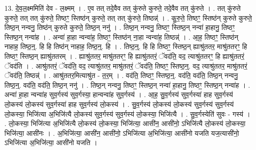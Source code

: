 \documentclass[17pt]{extarticle}
\begin{document}
13. दे॒व॒ल॒क्ष्ममिति॑ देव - ल॒क्ष्मम् । . ए॒व तत् तदे॒वैव तत् कु॑रुते कुरुते॒ तदे॒वैव तत् कु॑रुते । . तत् कु॑रुते कुरुते॒ तत् तत् कु॑रुते॒ तिष्ठꣳ॒॒ स्तिष्ठ॑न् कुरुते॒ तत् तत् कु॑रुते॒ तिष्ठन्न्॑ । . कु॒रु॒ते॒ तिष्ठꣳ॒॒ स्तिष्ठ॑न् कुरुते कुरुते॒ तिष्ठ॒न् नन्वनु॒ तिष्ठ॑न् कुरुते कुरुते॒ तिष्ठ॒न् ननु॑ । . तिष्ठ॒न् नन्वनु॒ तिष्ठꣳ॒॒ स्तिष्ठ॒न् नन्वा॑ हा॒हानु॒ तिष्ठꣳ॒॒ स्तिष्ठ॒न् नन्वा॑ह । . अन्वा॑ हा॒हा न्वन्वा॑ह॒ तिष्ठꣳ॒॒ स्तिष्ठ॑न् ना॒हा न्वन्वा॑ह॒ तिष्ठन्न्॑ । . आ॒ह॒ तिष्ठꣳ॒॒ स्तिष्ठ॑न् नाहाह॒ तिष्ठ॒न्॒. हि हि तिष्ठ॑न् नाहाह॒ तिष्ठ॒न्॒. हि । . तिष्ठ॒न्॒. हि हि तिष्ठꣳ॒॒ स्तिष्ठ॒न् ह्याश्रु॑ततर॒ माश्रु॑ततरꣳ॒॒ हि तिष्ठꣳ॒॒ स्तिष्ठ॒न् ह्याश्रु॑ततरम् । . ह्याश्रु॑ततर॒ माश्रु॑ततरꣳ॒॒ हि ह्याश्रु॑ततरं॒ ॅवद॑ति॒ वद॒ त्याश्रु॑ततरꣳ॒॒ हि ह्याश्रु॑ततरं॒ ॅवद॑ति । . आश्रु॑ततरं॒ ॅवद॑ति॒ वद॒ त्याश्रु॑ततर॒ माश्रु॑ततरं॒ ॅवद॑ति॒ तिष्ठꣳ॒॒ स्तिष्ठ॒न्॒. वद॒ त्याश्रु॑ततर॒ माश्रु॑ततरं॒ ॅवद॑ति॒ तिष्ठन्न्॑ । . आश्रु॑ततर॒मित्याश्रु॑त - त॒र॒म् । . वद॑ति॒ तिष्ठꣳ॒॒ स्तिष्ठ॒न्॒. वद॑ति॒ वद॑ति॒ तिष्ठ॒न् नन्वनु॒ तिष्ठ॒न्॒. वद॑ति॒ वद॑ति॒ तिष्ठ॒न् ननु॑ । . तिष्ठ॒न् नन्वनु॒ तिष्ठꣳ॒॒ स्तिष्ठ॒न् नन्वा॑ हा॒हानु॒ तिष्ठꣳ॒॒ स्तिष्ठ॒न् नन्वा॑ह । . अन्वा॑ हा॒हा न्वन्वा॑ह सुव॒र्गस्य॑ सुव॒र्गस्या॒ हान्वन्वा॑ह सुव॒र्गस्य॑ । . आ॒ह॒ सु॒व॒र्गस्य॑ सुव॒र्गस्या॑ हाह सुव॒र्गस्य॑ लो॒कस्य॑ लो॒कस्य॑ सुव॒र्गस्या॑ हाह सुव॒र्गस्य॑ लो॒कस्य॑ । . सु॒व॒र्गस्य॑ लो॒कस्य॑ लो॒कस्य॑ सुव॒र्गस्य॑ सुव॒र्गस्य॑ लो॒कस्या॒ भिजि॑त्या अ॒भिजि॑त्यै लो॒कस्य॑ सुव॒र्गस्य॑ सुव॒र्गस्य॑ लो॒कस्या॒ भिजि॑त्यै । . सु॒व॒र्गस्येति॑ सुवः - गस्य॑ । . लो॒कस्या॒ भिजि॑त्या अ॒भिजि॑त्यै लो॒कस्य॑ लो॒कस्या॒ भिजि॑त्या॒ आसी॑न॒ आसी॑नो॒ ऽभिजि॑त्यै लो॒कस्य॑ लो॒कस्या॒ भिजि॑त्या॒ आसी॑नः । . अ॒भिजि॑त्या॒ आसी॑न॒ आसी॑नो॒ ऽभिजि॑त्या अ॒भिजि॑त्या॒ आसी॑नो यजति यज॒त्यासी॑नो॒ ऽभिजि॑त्या अ॒भिजि॑त्या॒ आसी॑नो यजति । \newline
\end{document}
